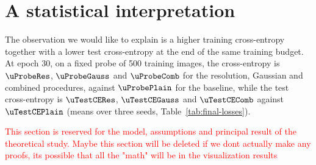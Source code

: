 \section{A statistical interpretation}
\label{sec:theory}
The observation we would like to explain is a higher training cross-entropy together with a lower test cross-entropy at the end of the same training budget. At epoch 30, on a fixed probe of 500 training images, the cross-entropy is $\uProbeRes$, $\uProbeGauss$ and $\uProbeComb$ for the resolution, Gaussian and combined procedures, against $\uProbePlain$ for the baseline, while the test cross-entropy is $\uTestCERes$, $\uTestCEGauss$ and $\uTestCEComb$ against $\uTestCEPlain$ (means over three seeds, Table~\ref{tab:final-losses}).


\textcolor{red}{This section is reserved for the model, assumptions and principal result of the theoretical study. Maybe this section will be deleted if we dont actually make any proofs, its possible that all the "math" will be in the visualization results}
